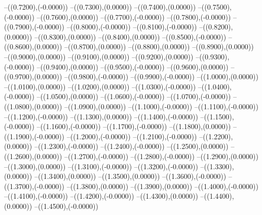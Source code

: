 {	--({\sx*(0.7200)},{\sy*(-0.0000)})
	--({\sx*(0.7300)},{\sy*(0.0000)})
	--({\sx*(0.7400)},{\sy*(0.0000)})
	--({\sx*(0.7500)},{\sy*(-0.0000)})
	--({\sx*(0.7600)},{\sy*(0.0000)})
	--({\sx*(0.7700)},{\sy*(-0.0000)})
	--({\sx*(0.7800)},{\sy*(-0.0000)})
	--({\sx*(0.7900)},{\sy*(-0.0000)})
	--({\sx*(0.8000)},{\sy*(-0.0000)})
	--({\sx*(0.8100)},{\sy*(-0.0000)})
	--({\sx*(0.8200)},{\sy*(0.0000)})
	--({\sx*(0.8300)},{\sy*(0.0000)})
	--({\sx*(0.8400)},{\sy*(0.0000)})
	--({\sx*(0.8500)},{\sy*(-0.0000)})
	--({\sx*(0.8600)},{\sy*(0.0000)})
	--({\sx*(0.8700)},{\sy*(0.0000)})
	--({\sx*(0.8800)},{\sy*(0.0000)})
	--({\sx*(0.8900)},{\sy*(0.0000)})
	--({\sx*(0.9000)},{\sy*(0.0000)})
	--({\sx*(0.9100)},{\sy*(0.0000)})
	--({\sx*(0.9200)},{\sy*(0.0000)})
	--({\sx*(0.9300)},{\sy*(-0.0000)})
	--({\sx*(0.9400)},{\sy*(0.0000)})
	--({\sx*(0.9500)},{\sy*(-0.0000)})
	--({\sx*(0.9600)},{\sy*(0.0000)})
	--({\sx*(0.9700)},{\sy*(0.0000)})
	--({\sx*(0.9800)},{\sy*(-0.0000)})
	--({\sx*(0.9900)},{\sy*(-0.0000)})
	--({\sx*(1.0000)},{\sy*(0.0000)})
	--({\sx*(1.0100)},{\sy*(0.0000)})
	--({\sx*(1.0200)},{\sy*(0.0000)})
	--({\sx*(1.0300)},{\sy*(-0.0000)})
	--({\sx*(1.0400)},{\sy*(-0.0000)})
	--({\sx*(1.0500)},{\sy*(0.0000)})
	--({\sx*(1.0600)},{\sy*(-0.0000)})
	--({\sx*(1.0700)},{\sy*(-0.0000)})
	--({\sx*(1.0800)},{\sy*(0.0000)})
	--({\sx*(1.0900)},{\sy*(0.0000)})
	--({\sx*(1.1000)},{\sy*(-0.0000)})
	--({\sx*(1.1100)},{\sy*(-0.0000)})
	--({\sx*(1.1200)},{\sy*(-0.0000)})
	--({\sx*(1.1300)},{\sy*(0.0000)})
	--({\sx*(1.1400)},{\sy*(-0.0000)})
	--({\sx*(1.1500)},{\sy*(-0.0000)})
	--({\sx*(1.1600)},{\sy*(-0.0000)})
	--({\sx*(1.1700)},{\sy*(-0.0000)})
	--({\sx*(1.1800)},{\sy*(0.0000)})
	--({\sx*(1.1900)},{\sy*(-0.0000)})
	--({\sx*(1.2000)},{\sy*(-0.0000)})
	--({\sx*(1.2100)},{\sy*(-0.0000)})
	--({\sx*(1.2200)},{\sy*(0.0000)})
	--({\sx*(1.2300)},{\sy*(-0.0000)})
	--({\sx*(1.2400)},{\sy*(-0.0000)})
	--({\sx*(1.2500)},{\sy*(0.0000)})
	--({\sx*(1.2600)},{\sy*(0.0000)})
	--({\sx*(1.2700)},{\sy*(-0.0000)})
	--({\sx*(1.2800)},{\sy*(-0.0000)})
	--({\sx*(1.2900)},{\sy*(0.0000)})
	--({\sx*(1.3000)},{\sy*(0.0000)})
	--({\sx*(1.3100)},{\sy*(-0.0000)})
	--({\sx*(1.3200)},{\sy*(-0.0000)})
	--({\sx*(1.3300)},{\sy*(0.0000)})
	--({\sx*(1.3400)},{\sy*(0.0000)})
	--({\sx*(1.3500)},{\sy*(0.0000)})
	--({\sx*(1.3600)},{\sy*(-0.0000)})
	--({\sx*(1.3700)},{\sy*(-0.0000)})
	--({\sx*(1.3800)},{\sy*(0.0000)})
	--({\sx*(1.3900)},{\sy*(0.0000)})
	--({\sx*(1.4000)},{\sy*(-0.0000)})
	--({\sx*(1.4100)},{\sy*(-0.0000)})
	--({\sx*(1.4200)},{\sy*(-0.0000)})
	--({\sx*(1.4300)},{\sy*(0.0000)})
	--({\sx*(1.4400)},{\sy*(0.0000)})
	--({\sx*(1.4500)},{\sy*(-0.0000)})
}
